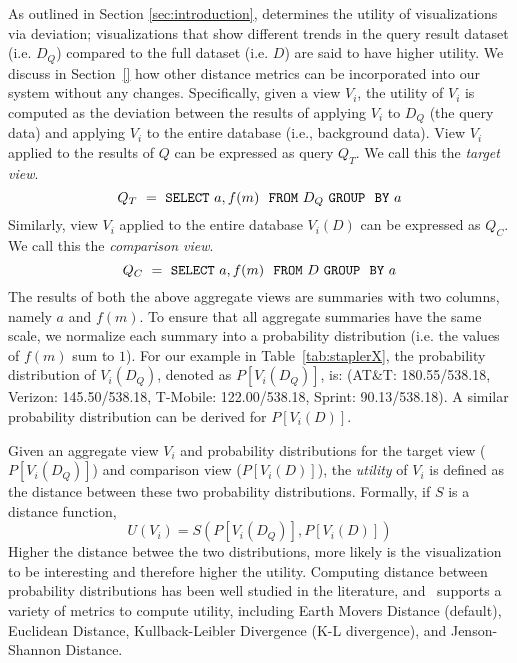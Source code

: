As outlined in Section \ref{sec:introduction}, \SeeDB determines the utility of 
visualizations via deviation; visualizations that show different trends in the query
result dataset (i.e. $D_Q$) compared to the full dataset (i.e. $D$) are said to have higher
utility.
We discuss in Section~\ref{} how other distance metrics can be incorporated into our system
without any changes.
Specifically, given a view $V_i$, the utility of $V_i$ is
computed as the deviation between the results of applying $V_i$ to $D_Q$ (the 
query data) and applying $V_i$ to the entire database (i.e., background data).
View $V_i$ applied to the results of $Q$ can be expressed as query $Q_T$. 
We call this the {\em target view}.
$$ Q_T\ =\ {\tt SELECT \ } a, f(m) \ \ {\tt FROM} \  D_Q\  {\tt GROUP \ \ BY} \ a$$ 
Similarly, view $V_i$ applied to the entire database $V_i (D)$ can be expressed as $Q_C$. 
We call this the {\em comparison view}. 
$$ Q_C\ =\ {\tt SELECT \ } a, f(m) \ \ {\tt FROM} \  D\  {\tt GROUP \ \ BY} \ a$$
The results of both the above aggregate views are summaries with two columns, namely $a$ and
$f(m)$. 
To ensure that all aggregate summaries have the same scale, we normalize each 
summary into a probability distribution (i.e. the values of $f(m)$ sum to $1$).
For our example in Table~\ref{tab:staplerX}, the probability distribution of
$V_i(D_Q)$, denoted as $P[V_i (D_Q)]$, is: (AT\&T: 180.55/538.18, Verizon:
145.50/538.18, T-Mobile: 122.00/538.18,  Sprint: 90.13/538.18). 
A similar probability distribution can be derived for $P[V_i (D)]$.

Given an aggregate view $V_i$ and probability distributions for the
target view  ($P[V_i (D_Q)]$) and comparison view ($P[V_i (D)]$), the
{\em utility} of $V_i$ is defined as the distance between these two probability
distributions. Formally, if $S$ is a distance function,
$$ U (V_i) = S ( P[V_i (D_Q)], P[V_i (D)] )$$
Higher the distance betwee the two distributions, more likely is the
visualization to be interesting and therefore higher the utility.
Computing distance between probability distributions has
been well studied in the literature, and \SeeDB\ supports a variety of metrics
to compute utility, including Earth Movers Distance (default), 
Euclidean Distance, Kullback-Leibler Divergence (K-L
divergence), and Jenson-Shannon
Distance. 

